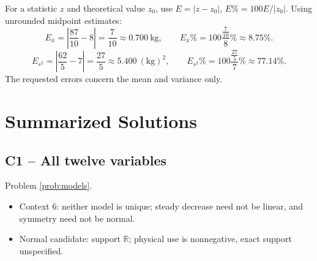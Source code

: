 For a statistic $z$ and theoretical value $z_0$, use $E=|z-z_0|$, $E\%=100E/|z_0|$.
Using unrounded midpoint estimates:
\[E_{\bar x}=\left|\frac{87}{10}-8\right|=\frac{7}{10}\approx0.700\ \mathrm{kg},\qquad E_{\bar x}\%=100\frac{\frac{7}{10}}{8}\%\approx8.75\%.\]
\[E_{s^2}=\left|\frac{62}{5}-7\right|=\frac{27}{5}\approx5.400\ (\mathrm{kg})^2,\qquad E_{s^2}\%=100\frac{\frac{27}{5}}{7}\%\approx77.14\%.\]
The requested errors concern the mean and variance only.

\clearpage\section{Summarized Solutions}\label{sec:summary}\begingroup\setlength{\parskip}{2pt}
\subsection*{C1 -- All twelve variables}
Problem \ref{prob:models}.
\par\smallskip{}\smallskip
\begin{itemize}[nosep]
\item Context 6: neither model is unique; steady decrease need not be linear, and symmetry need not be normal.
\item Normal candidate: support $\mathbb R$; physical use is nonnegative, exact support unspecified.
\end{itemize}
